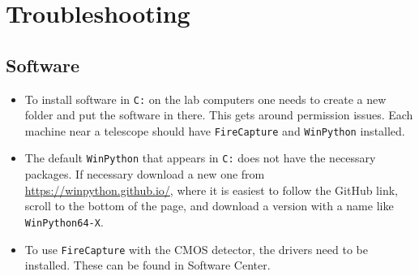 \documentclass[11pt]{article}
\begin{document}
\section{Troubleshooting}

\subsection{Software}

\begin{itemize}
    \item To install software in \texttt{C:} on the lab computers one needs to create a new folder and put the software in there. This gets around permission issues. Each machine near a telescope should have \texttt{FireCapture} and \texttt{WinPython} installed.

    \item The default \texttt{WinPython} that appears in \texttt{C:} does not have the necessary packages. If necessary download a new one from \href{https://winpython.github.io/}{https://winpython.github.io/}, where it is easiest to follow the GitHub link, scroll to the bottom of the page, and download a version with a name like \texttt{WinPython64-X}.

    \item To use \texttt{FireCapture} with the CMOS detector, the drivers need to be installed. These can be found in Software Center.
\end{itemize}

\clearpage



\end{document}
